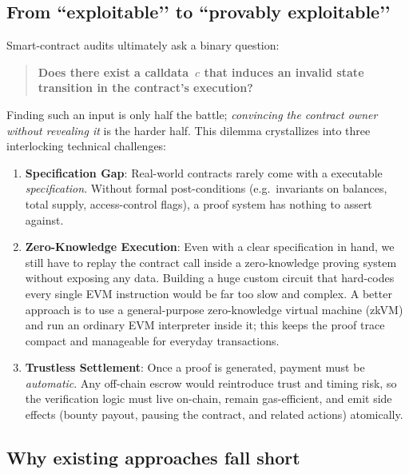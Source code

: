 \subsection*{From “exploitable’’ to “provably exploitable’’}
Smart-contract audits ultimately ask a binary question:  

\begin{quote}
    \centering
    \textbf{Does there exist a calldata~$c$ that induces an \textbf{invalid state transition} in the contract’s execution?}
\end{quote}

Finding such an input is only half the battle; \textit{convincing the contract owner without revealing it} is the harder half.  
This dilemma crystallizes into three interlocking technical challenges:

\begin{enumerate}[label=\textbf{C\arabic*}:, leftmargin=1.8cm]
    \item \textbf{Specification Gap}: Real-world contracts rarely come with a
    executable \textit{specification}. Without formal post-conditions (e.g.\ invariants on balances, total supply, access-control flags), a proof system has nothing to assert against.
    \vspace{2pt}
    \item \textbf{Zero-Knowledge Execution}: Even with a clear specification in hand, we still have to replay the contract call inside a zero-knowledge proving system without exposing any data. Building a huge custom circuit that hard-codes every single EVM instruction would be far too slow and complex. A better approach is to use a general-purpose zero-knowledge virtual machine (zkVM) and run an ordinary EVM interpreter inside it; this keeps the proof trace compact and manageable for everyday transactions.
    \vspace{2pt}
    \item \textbf{Trustless Settlement}: Once a proof is generated, payment must be \textit{automatic}. Any off-chain escrow would reintroduce trust and timing risk, so the verification logic must live on-chain, remain gas-efficient, and emit side effects (bounty payout, pausing the contract, and related actions) atomically.
\end{enumerate}

\subsection*{Why existing approaches fall short}

